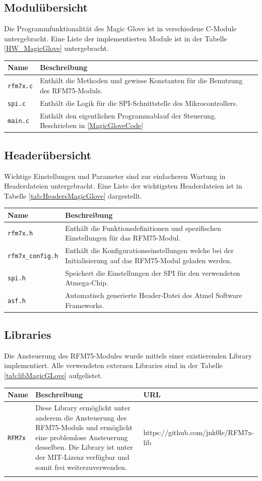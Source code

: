 \subsection*{Modulübersicht}
Die Programmfunktionalität des Magic Glove ist in verschiedene C-Module untergebracht. Eine Liste der implementierten Module ist in der Tabelle \ref{HW_MagicGlove} untergebracht.
\begin{tabularx}{\textwidth}{l|X}
	Name & Beschreibung \\ \hline
	\texttt{rfm7x.c} & Enthält die Methoden und gewisse Konstanten für die Benutzung des RFM75-Moduls. \\ \hline
	\texttt{spi.c} & Enthält die Logik für die SPI-Schnittstelle des Mikrocontrollers. \\ \hline
	\texttt{main.c} & Enthält den eigentlichen Programmablauf der Steuerung. Beschrieben in \ref{MagicGloveCode} 
	\label{tab:ModulesMagicGlove}
\end{tabularx}
\subsection*{Headerübersicht}
Wichtige Einstellungen und Parameter sind zur einfacheren Wartung in Headerdateien untergebracht. Eine Liste der wichtigsten Headerdateien ist in Tabelle \ref{tab:HeadersMagicGlove} dargestellt.
\begin{tabularx}{\textwidth}{l|X}
	Name & Beschreibung \\ \hline
	\texttt{rfm7x.h} & Enthält die Funktionsdefinitionen und spezifischen Einstellungen für das RFM75-Modul. \\ \hline
	\texttt{rfm7x{\_}config.h} & Enthält die Konfigurationseinstellungen welche bei der Initialisierung auf das RFM75-Modul geladen werden. \\ \hline
	\texttt{spi.h} & Speichert die Einstellungen der SPI für den verwendeten Atmega-Chip. \\ \hline
	\texttt{asf.h} & Automatisch generierte Header-Datei des Atmel Software Frameworks.
	\label{tab:HeadersMagicGlove}
\end{tabularx}
\subsection*{Libraries}
Die Ansteuerung des RFM75-Modules wurde mittels einer existierenden Library implementiert. Alle verwendeten externen Libraries sind in der Tabelle \ref{tab:libMagicGLove} aufgelistet.\\
\begin{tabularx}{\textwidth}{l|X|l}
	Name & Beschreibung & URL \\ \hline
	\texttt{RFM7x} &  Diese Library ermöglicht unter anderem die Ansteuerung des RFM75-Moduls und ermöglicht eine problemlose Ansteuerung desselben. Die Library ist unter der MIT-Lizenz verfügbar und somit frei weiterzuverwenden. & https://github.com/jnk0le/RFM7x-lib \\
	\label{tab:libMagicGLove}
\end{tabularx}
\newpage
